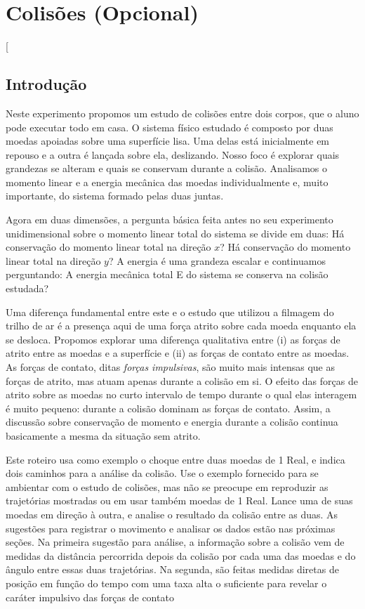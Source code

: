 \chapter{Colisões (Opcional)}
\label{chap:colisaoopcional}
\vspace{-0.7cm}
[\thispagestyle{empty}
\section{Introdução}

Neste experimento propomos um estudo de colisões entre dois corpos, que o aluno pode executar todo em casa. O sistema físico estudado é composto por duas moedas apoiadas sobre uma superfície lisa. Uma delas está inicialmente em repouso e a outra é lançada sobre ela, deslizando. Nosso foco é explorar quais grandezas se alteram e quais se conservam durante a colisão. Analisamos o momento linear e a energia mecânica das moedas individualmente e, muito importante, do sistema formado pelas duas juntas.

Agora em duas dimensões, a pergunta básica feita antes no seu experimento unidimensional sobre o momento linear total do sistema se divide em duas: Há conservação do momento linear total na direção $x$? Há conservação do momento linear total na direção $y$? A energia é uma grandeza escalar e continuamos perguntando: A energia mecânica total E do sistema se conserva na colisão estudada? 

Uma diferença fundamental entre este e o estudo que utilizou a filmagem do trilho de ar é a presença aqui de uma força atrito sobre cada moeda enquanto ela se desloca. Propomos explorar uma diferença qualitativa entre (i) as forças de atrito entre as moedas e a superfície e (ii) as forças de contato entre as moedas. As forças de contato, ditas {\it forças impulsivas}, são muito mais intensas que as forças de atrito, mas atuam apenas durante a colisão em si. O efeito das forças de atrito sobre as moedas no curto intervalo de tempo durante o qual elas interagem é muito pequeno: durante a colisão dominam as forças de contato. Assim, a discussão sobre conservação de momento e energia durante a colisão continua basicamente a mesma da situação sem atrito.

Este roteiro usa como exemplo o choque entre duas moedas de 1 Real, e indica dois caminhos para a análise da colisão. Use o exemplo fornecido para se ambientar com o estudo de colisões, mas não se preocupe em reproduzir as trajetórias mostradas ou em usar também moedas de 1 Real. Lance uma de suas moedas em direção à outra, e analise o resultado da colisão entre as duas. As sugestões para registrar o movimento e analisar os dados estão nas próximas seções. Na primeira sugestão para análise, a informação sobre a colisão vem de medidas da distância percorrida depois da colisão por cada uma das moedas \cite{Galante2020} e do ângulo entre essas duas trajetórias.  Na segunda, são feitas medidas diretas de posição em função do tempo com uma taxa alta o suficiente para revelar o caráter impulsivo das forças de contato~\cite{deJesus2016}

